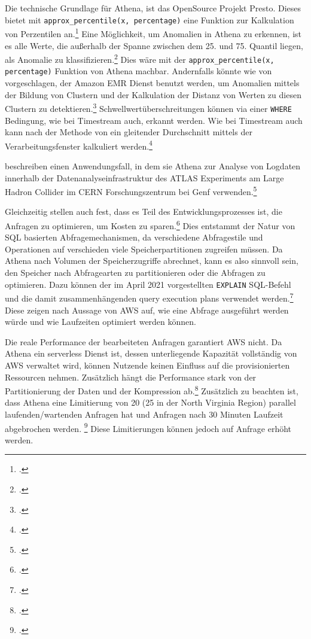 \label{anhang:vergleich-athena}
Die technische Grundlage für Athena, ist das OpenSource Projekt Presto. Dieses bietet mit \texttt{approx_percentile(x, percentage)} eine Funktion zur Kalkulation von Perzentilen an.\footcite[Vgl.][]{ThePrestoFoundation.o.J.}
Eine Möglichkeit, um Anomalien in Athena zu erkennen, ist es alle Werte, die außerhalb der Spanne zwischen dem 25. und 75. Quantil liegen, als Anomalie zu klassifizieren.\footcite[Vgl.][]{Salgado.2019} Dies wäre mit der \texttt{approx_percentile(x, percentage)} Funktion von Athena machbar. Andernfalls könnte wie von \citeauthor{Megler.2016} vorgeschlagen, der Amazon \ac{EMR} Dienst benutzt werden, um Anomalien mittels der Bildung von Clustern und der Kalkulation der Distanz von Werten zu diesen Clustern zu detektieren.\footcite[Vgl.][]{Megler.2016}
Schwellwertüberschreitungen können via einer \texttt{WHERE} Bedingung, wie bei Timestream auch, erkannt werden.
Wie bei Timestream auch kann nach der Methode von \citeauthor{Ross.2020} ein gleitender Durchschnitt mittels der Verarbeitungsfenster kalkuliert werden.\footcite[Vgl.][]{Ross.2020}


\citeauthor{Hartland.2018} beschreiben einen Anwendungsfall, in dem sie Athena zur Analyse von Logdaten innerhalb der Datenanalyseinfrastruktur des ATLAS Experiments am Large Hadron Collider im CERN Forschungszentrum bei Genf verwenden.\footcite[Vgl.][]{Hartland.2018}

Gleichzeitig stellen \citeauthor{Hartland.2018} auch fest, dass es Teil des Entwicklungsprozesses ist, die Anfragen zu  optimieren, um Kosten zu sparen.\footcite[Vgl.][5]{Hartland.2018} Dies entstammt der Natur von \ac{SQL} basierten Abfragemechanismen, da verschiedene Abfragestile und Operationen auf verschieden viele Speicherpartitionen zugreifen müssen. Da Athena nach Volumen der Speicherzugriffe abrechnet, kann es also sinnvoll sein, den Speicher nach Abfragearten zu partitionieren oder die Abfragen zu optimieren. Dazu können der im April 2021 vorgestellten \texttt{EXPLAIN} \ac{SQL}-Befehl und die damit zusammenhängenden query execution plans verwendet werden.\footcite[Vgl. auch im Folgenden][]{AmazonWebServicesInc..2021} Diese zeigen nach Aussage von \ac{AWS} auf, wie eine Abfrage ausgeführt werden würde und wie Laufzeiten optimiert werden können.

Die reale Performance der bearbeiteten Anfragen garantiert \ac{AWS} nicht. Da Athena ein serverless Dienst ist, dessen unterliegende Kapazität vollständig von \ac{AWS} verwaltet wird, können Nutzende keinen Einfluss auf die provisionierten Ressourcen nehmen. Zusätzlich hängt die Performance stark von der Partitionierung der Daten und der Kompression ab.\footcite[Vgl.][]{Levy.2021} Zusätzlich zu beachten ist, dass Athena eine Limitierung von 20 (25 in der North Virginia Region) parallel laufenden/wartenden Anfragen hat und Anfragen nach 30 Minuten Laufzeit abgebrochen werden. \footcite[Vgl. auch im Folgenden][]{AmazonWebServicesInc..o.J.ac} Diese Limitierungen können jedoch auf Anfrage erhöht werden.

